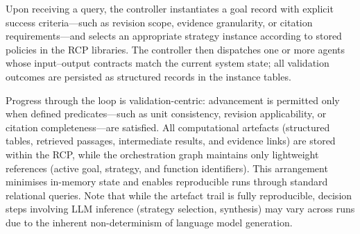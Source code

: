 \documentclass[largeformat]{interact}
\begin{document}

Upon receiving a query, the controller instantiates a goal record with explicit success criteria---such as revision scope, evidence granularity, or citation requirements---and selects an appropriate strategy instance according to stored policies in the RCP libraries. The controller then dispatches one or more agents whose input--output contracts match the current system state; all validation outcomes are persisted as structured records in the instance tables.


Progress through the loop is validation-centric: advancement is permitted only when defined predicates---such as unit consistency, revision applicability, or citation completeness---are satisfied. All computational artefacts (structured tables, retrieved passages, intermediate results, and evidence links) are stored within the RCP, while the orchestration graph maintains only lightweight references (active goal, strategy, and function identifiers). This arrangement minimises in-memory state and enables reproducible runs through standard relational queries. Note that while the artefact trail is fully reproducible, decision steps involving LLM inference (strategy selection, synthesis) may vary across runs due to the inherent non-determinism of language model generation.
\end{document}
